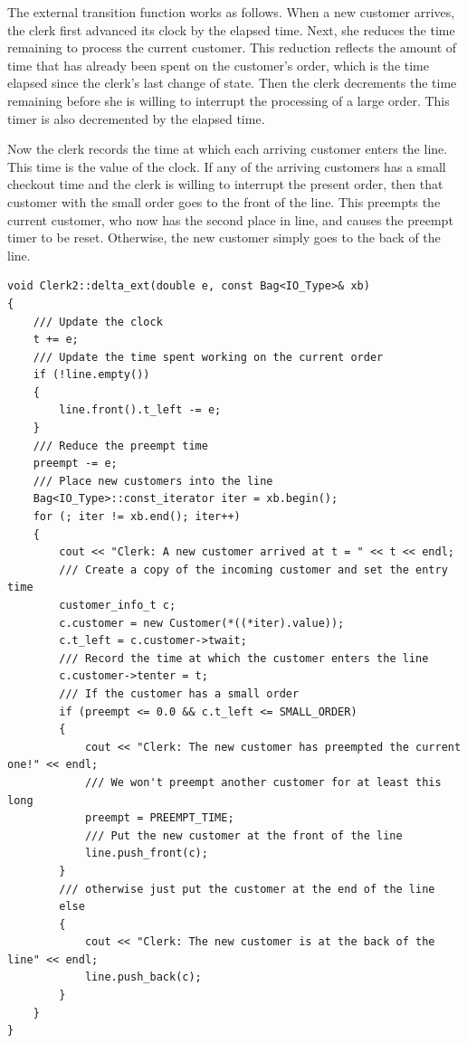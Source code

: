 The external transition function works as follows. When a new customer arrives, the clerk first advanced its clock by the elapsed time. Next, she reduces the time remaining to process the current customer. This reduction reflects the amount of time that has already been spent on the customer's order, which is the time elapsed since the clerk's last change of state. Then the clerk decrements the time remaining before she is willing to interrupt the processing of a large order. This timer is also decremented by the elapsed time.

Now the clerk records the time at which each arriving customer enters the line. This time is the value of the clock. If any of the arriving customers has a small checkout time and the clerk is willing to interrupt the present order, then that customer with the small order goes to the front of the line. This preempts the current customer, who now has the second place in line, and causes the preempt timer to be reset. Otherwise, the new customer simply goes to the back of the line.
\begin{verbatim}
void Clerk2::delta_ext(double e, const Bag<IO_Type>& xb)
{
    /// Update the clock
    t += e;
    /// Update the time spent working on the current order
    if (!line.empty())
    {
        line.front().t_left -= e;
    }
    /// Reduce the preempt time
    preempt -= e;
    /// Place new customers into the line
    Bag<IO_Type>::const_iterator iter = xb.begin();
    for (; iter != xb.end(); iter++)
    {
        cout << "Clerk: A new customer arrived at t = " << t << endl;
        /// Create a copy of the incoming customer and set the entry time
        customer_info_t c;
        c.customer = new Customer(*((*iter).value));
        c.t_left = c.customer->twait;
        /// Record the time at which the customer enters the line
        c.customer->tenter = t;
        /// If the customer has a small order
        if (preempt <= 0.0 && c.t_left <= SMALL_ORDER)
        {
            cout << "Clerk: The new customer has preempted the current one!" << endl;
            /// We won't preempt another customer for at least this long
            preempt = PREEMPT_TIME;
            /// Put the new customer at the front of the line
            line.push_front(c);
        }
        /// otherwise just put the customer at the end of the line
        else
        {
            cout << "Clerk: The new customer is at the back of the line" << endl;
            line.push_back(c);
        }
    }
}
\end{verbatim}

